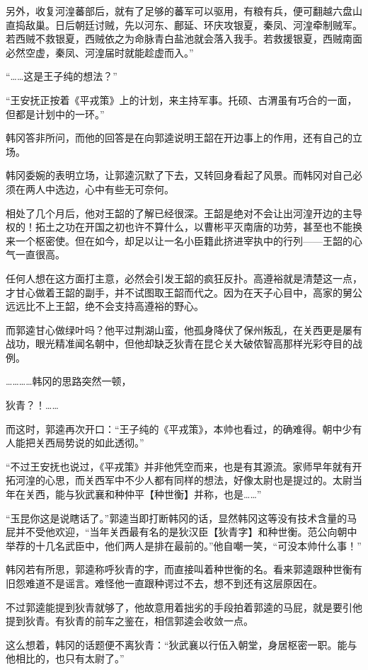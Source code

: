 另外，收复河湟蕃部后，就有了足够的蕃军可以驱用，有粮有兵，便可翻越六盘山直捣敌巢。日后朝廷讨贼，先以河东、鄜延、环庆攻银夏，秦凤、河湟牵制贼军。若西贼不救银夏，西贼依之为命脉青白盐池就会落入我手。若救援银夏，西贼南面必然空虚，秦凤、河湟届时就能趁虚而入。”

“……这是王子纯的想法？”

“王安抚正按着《平戎策》上的计划，来主持军事。托硕、古渭虽有巧合的一面，但都是计划中的一环。”

韩冈答非所问，而他的回答是在向郭逵说明王韶在开边事上的作用，还有自己的立场。

韩冈委婉的表明立场，让郭逵沉默了下去，又转回身看起了风景。而韩冈对自己必须在两人中选边，心中有些无可奈何。

相处了几个月后，他对王韶的了解已经很深。王韶是绝对不会让出河湟开边的主导权的！拓土之功在开国之初也许不算什么，以曹彬平灭南唐的功劳，甚至也不能换来一个枢密使。但在如今，却足以让一名小臣籍此挤进宰执中的行列——王韶的心气一直很高。

任何人想在这方面打主意，必然会引发王韶的疯狂反扑。高遵裕就是清楚这一点，才甘心做着王韶的副手，并不试图取王韶而代之。因为在天子心目中，高家的舅公远远比不上王韶，绝不会支持高遵裕的野心。

而郭逵甘心做绿叶吗？他平过荆湖山蛮，他孤身降伏了保州叛乱，在关西更是屡有战功，眼光精准闻名朝中，但他却缺乏狄青在昆仑关大破侬智高那样光彩夺目的战例。

…………韩冈的思路突然一顿，

狄青？！……

而这时，郭逵再次开口：“王子纯的《平戎策》，本帅也看过，的确难得。朝中少有人能把关西局势说的如此透彻。”

“不过王安抚也说过，《平戎策》并非他凭空而来，也是有其源流。家师早年就有开拓河湟的心思，而关西军中不少人都有同样的想法，好像太尉也是提过的。太尉当年在关西，能与狄武襄和种仲平【种世衡】并称，也是……”

“玉昆你这是说瞎话了。”郭逵当即打断韩冈的话，显然韩冈这等没有技术含量的马屁并不受他欢迎，“当年关西最有名的是狄汉臣【狄青字】和种世衡。范公向朝中举荐的十几名武臣中，他们两人是排在最前的。”他自嘲一笑，“可没本帅什么事！”

韩冈若有所思，郭逵称呼狄青的字，而直接叫着种世衡的名。看来郭逵跟种世衡有旧怨难道不是谣言。难怪他一直跟种谔过不去，想不到还有这层原因在。

不过郭逵能提到狄青就够了，他故意用着拙劣的手段拍着郭逵的马屁，就是要引他提到狄青。有狄青的前车之鉴在，相信郭逵会收敛一点。

这么想着，韩冈的话题便不离狄青：“狄武襄以行伍入朝堂，身居枢密一职。能与他相比的，也只有太尉了。”

